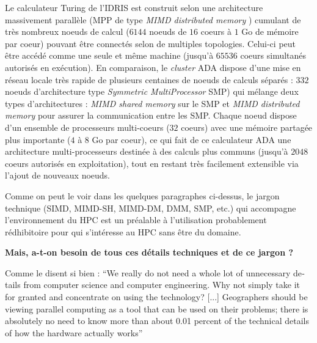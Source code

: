 Le calculateur Turing de l'IDRIS  est construit selon une architecture massivement parallèle (MPP de type \textit{MIMD distributed memory} \autocite{Snir2011}) cumulant de très nombreux noeuds de calcul ($\num{6144}$ noeuds de $16$ coeurs à $1$ Go de mémoire par coeur) pouvant être connectés selon de multiples topologies. Celui-ci peut être accédé comme une seule et même machine (jusqu'à $\num{65536}$ coeurs simultanés autorisés en exécution). En comparaison, le \textit{cluster} ADA dispose d'une mise en réseau locale très rapide de plusieurs centaines de noeuds de calculs séparés : $332$ noeuds d'architecture type \textit{Symmetric MultiProcessor} SMP) qui mélange deux types d'architectures : \textit{MIMD shared memory} sur le SMP et \textit{MIMD distributed memory} pour assurer la communication entre les SMP. Chaque noeud dispose d'un ensemble de processeurs multi-coeurs ($32$ coeurs) avec une mémoire partagée plus importante ($4$ à $8$ Go par coeur), ce qui fait de ce calculateur ADA une architecture multi-processeurs destinée à des calculs plus communs (jusqu'à $\num{2048}$ coeurs autorisés en exploitation), tout en restant très facilement extensible via l'ajout de nouveaux noeuds.

Comme on peut le voir dans les quelques paragraphes ci-dessus, le jargon technique (SIMD, MIMD-SH, MIMD-DM, DMM, SMP, etc.) qui accompagne l'environnement du HPC est un préalable à l'utilisation probablement rédhibitoire pour qui s'intéresse au HPC sans être du domaine.

\textbf{Mais, a-t-on besoin de tous ces détails techniques et de ce jargon ?}

Comme le disent si bien \textcite{Openshaw2000} : \foreignquote{english}{We really do not need a whole lot of unnecessary details from computer science and computer engineering. Why not simply take it for granted and concentrate on using the technology? [...] Geographers should be viewing parallel computing as a tool that can be used on their problems; there is absolutely no need to know more than about 0.01 percent of the technical details of how the hardware actually works}

